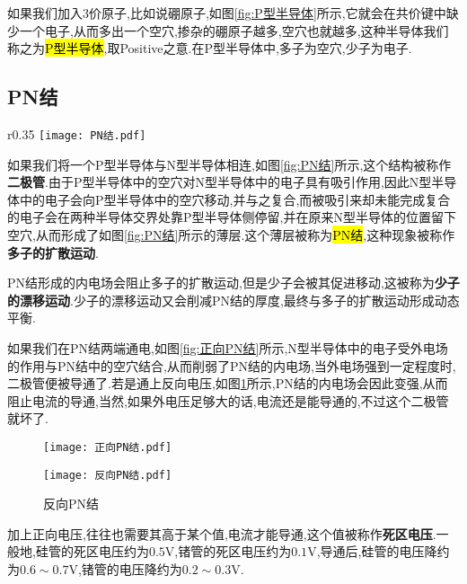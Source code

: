 \Par 如果我们加入3价原子,比如说硼原子,如图\ref{fig:P型半导体}所示,它就会在共价键中缺少一个电子,从而多出一个空穴,掺杂的硼原子越多,空穴也就越多,这种半导体我们称之为\hl{P型半导体},取Positive之意.在P型半导体中,多子为空穴,少子为电子.

\subsection{\K PN结}

\begin{wrapfigure}{r}{0.35\textwidth}
	\centering
	\texttt{[image: PN结.pdf]}
	\caption{PN结}
	\label{fig:PN结}
\end{wrapfigure}
\Par 如果我们将一个P型半导体与N型半导体相连,如图\ref{fig:PN结}所示,这个结构被称作\textbf{二极管}.由于P型半导体中的空穴对N型半导体中的电子具有吸引作用,因此N型半导体中的电子会向P型半导体中的空穴移动,并与之复合,而被吸引来却未能完成复合的电子会在两种半导体交界处靠P型半导体侧停留,并在原来N型半导体的位置留下空穴,从而形成了如图\ref{fig:PN结}所示的薄层.这个薄层被称为\hl{PN结},这种现象被称作\textbf{多子的扩散运动}.

\Par PN结形成的内电场会阻止多子的扩散运动,但是少子会被其促进移动,这被称为\textbf{少子的漂移运动}.少子的漂移运动又会削减PN结的厚度,最终与多子的扩散运动形成动态平衡.


\Par 如果我们在PN结两端通电,如图\ref{fig:正向PN结}所示,N型半导体中的电子受外电场的作用与PN结中的空穴结合,从而削弱了PN结的内电场,当外电场强到一定程度时,二极管便被导通了.若是通上反向电压,如图\ref{fig:反向PN结}所示,PN结的内电场会因此变强,从而阻止电流的导通,当然,如果外电压足够大的话,电流还是能导通的,不过这个二极管就坏了.

\begin{figure}[htbp]
	\centering
	\begin{minipage}{0.48\textwidth}
		\centering
		\texttt{[image: 正向PN结.pdf]}
	\caption{正向PN结}
	\label{fig:正向PN结}
	\end{minipage}
	\begin{minipage}{0.48\textwidth}
		\centering
	\texttt{[image: 反向PN结.pdf]}
	\caption{反向PN结}
	\label{fig:反向PN结}
	\end{minipage}
\end{figure}
\Par 加上正向电压,往往也需要其高于某个值,电流才能导通,这个值被称作\textbf{死区电压}.一般地,硅管的死区电压约为$0.5\mathrm{V}$,锗管的死区电压约为$0.1\mathrm{V}$,导通后,硅管的电压降约为$0.6\sim 0.7\mathrm{V}$,锗管的电压降约为$0.2\sim 0.3\mathrm{V}$.

